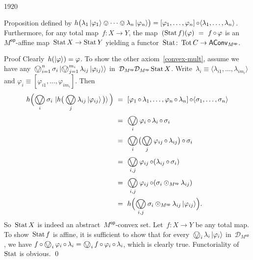 \begin{parsec}{1920}
\begin{point}{70}{Proposition}
    defined by
    $h\bigl( \lambda_1 \ket{\varphi_1} \ovee \cdots \ovee \lambda_n \ket{\varphi_n} \bigr)
     =  [\varphi_1, \ldots, \varphi_n] \mathop{\circ} \langle
                    \lambda_1, \ldots, \lambda_n\rangle$.
Furthermore,
    for any total map~$f\colon X \to Y$,
    the map~$ (\operatorname{Stat} f)(\varphi) \ = \ f \mathop{\circ} \varphi$
    is an~$M^{\mathsf{op}}$-affine map~$\operatorname{Stat} X \to \operatorname{Stat} Y$ yielding a
    functor~$\operatorname{Stat} \colon \operatorname{Tot} C \to \mathsf{AConv}_{M^{\mathsf{op}}}$.
\begin{point}{80}{Proof}%
Clearly~$h(\ket{\varphi}) = \varphi$.
To show the other axiom~\eqref{convex-mult},
assume we have any~$\bigovee^n_{i=1} \sigma_i \ket{\bigovee^{m_i}_{j=1} \lambda_{ij} \ket{\varphi_{ij}}}$
in~$\mathcal{D}_{M^\mathsf{op}} \mathcal{D}_{M^{\mathsf{op}}} \operatorname{Stat} X$.
Write~$\lambda_i \equiv \langle\lambda_{i1}, \ldots, \lambda_{im_i}\rangle$
and $\varphi_i \equiv [\varphi_{i1}, \ldots, \varphi_{i{m_i}}]$.
Then
\begin{align*}
    h \Bigl( \bigovee_i \sigma_i \, \ket{
        h\bigl(\, \bigovee_j \lambda_{ij} \ket{\varphi_{ij}}\, \bigr)
    } \, \Bigr)
    &\ = \ 
    [\varphi_1 \after \lambda_1, \ldots, 
    \varphi_n \after \lambda_n] \after \langle
    \sigma_1, \ldots, \sigma_n
    \rangle
    \\ & \ = \ 
    \bigovee_{i} \varphi_i \after \lambda_i \after \sigma_i
    \\ & \ = \ 
    \bigovee_{i} \bigl(\bigovee_j \varphi_{ij} \after \lambda_{ij}\bigr) \after \sigma_i
    \\ & \ = \ 
    \bigovee_{i,j} \varphi_{ij} \after (\lambda_{ij} \after \sigma_i)
    \\ & \ = \ 
    \bigovee_{i,j} \varphi_{ij} \after (\sigma_i \odot_{M^{\mathsf{op}}} \lambda_{ij})
    \\ & \ = \ 
    h \Bigl( \bigovee_{i,j} \sigma_i \odot_{M^{\mathsf{op}}} \lambda_{ij} \ket{\varphi_{ij}} \Bigr).
\end{align*}
So~$\operatorname{Stat} X$ is indeed an abstract~$M^{\mathsf{op}}$-convex set.
Let~$f\colon X \to Y$ be any total map.
To show~$\operatorname{Stat} f$ is affine,
it is sufficient to show that
for every~$\bigovee_i \lambda_i \ket{\varphi_i}$
 in~$\mathcal{D}_{M^{\mathsf{op}}}$,
 we have
        $f \after \bigovee_i  \varphi_i \after \lambda_i 
         = 
        \bigovee_i f \after  \varphi_i \after \lambda_i$,
        which is clearly true.
    Functoriality of~$\operatorname{Stat}$ is obvious. \qed
\end{point}
\end{point}
\end{parsec}

